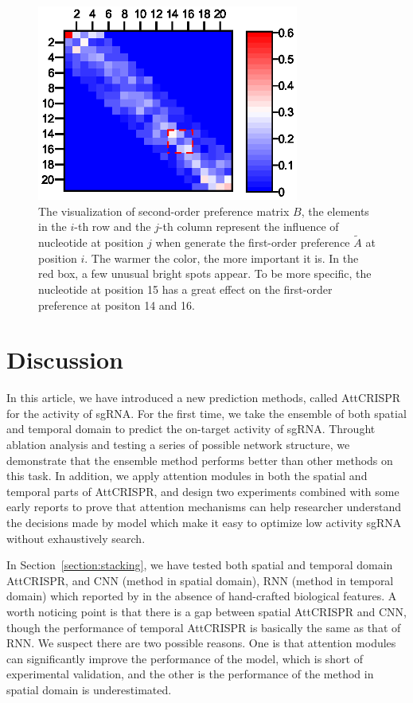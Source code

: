 \documentclass{bioinfo}
\begin{document}
\begin{figure}[!tpb]
    \centerline{\includegraphics[width=86mm]{secondorder.eps}}
    \caption{The visualization of second-order preference matrix $B$, 
the elements in the $i$-th row and the $j$-th column represent the influence of nucleotide at position $j$ when generate the first-order preference $\tilde{A}$ at position $i$. 
The warmer the color, the more important it is. 
In the red box, a few unusual bright spots appear. 
To be more specific, the nucleotide at position 15 has a great effect on the first-order preference at positon 14 and 16.
}\label{fig:heatmap}
\end{figure}

\section{Discussion}

In this article, we have introduced a new prediction methods, called AttCRISPR for the activity of sgRNA. 
For the first time, we take the ensemble of both spatial and temporal domain to predict the on-target activity of sgRNA. 
Throught ablation analysis and testing a series of possible network structure, we demonstrate that the ensemble method performs better than other methods on this task. 
In addition, we apply attention modules in both the spatial and temporal parts of AttCRISPR, 
and design two experiments combined with some early reports to prove that attention mechanisms can help researcher understand the decisions made by model which make it easy to optimize low activity sgRNA without exhaustively search. 

In Section~\ref{section:stacking}, we have tested both spatial and temporal domain AttCRISPR, and CNN (method in spatial domain), RNN (method in temporal domain) which reported by \citeauthor{wang2019optimized} in the absence of hand-crafted biological features. 
A worth noticing point is that there is a gap between spatial AttCRISPR and CNN, though the performance of temporal AttCRISPR is basically the same as that of RNN. 
We suspect there are two possible reasons. 
One is that attention modules can significantly improve the performance of the model, which is short of experimental validation, 
and the other is the performance of the method in spatial domain is underestimated. 
\end{document}
